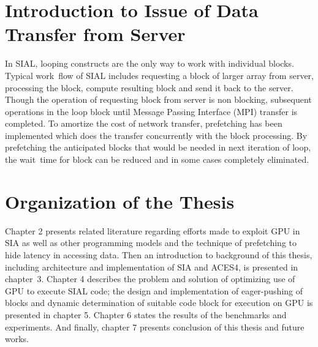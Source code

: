 \section{Introduction to Issue of Data Transfer from Server}
In SIAL, looping constructs are the only way to work with individual blocks.
Typical work~flow of SIAL includes requesting a block of larger array from server,
processing the block, compute resulting block and send it back to the server. Though
the operation of requesting block from server is non blocking, subsequent operations
in the loop block until Message Passing Interface (MPI) transfer is completed. To amortize the cost of network
transfer, prefetching has been implemented which does the transfer concurrently
with the block processing. By prefetching the anticipated blocks that would be
needed in next iteration of loop, the wait~time for block can be reduced and
in some cases completely eliminated.

\section{Organization of the Thesis}
Chapter 2 presents related literature regarding efforts made to exploit GPU in
SIA as well as other programming models and the technique of prefetching to hide
latency in accessing data. Then an introduction to background of this thesis,
including architecture and implementation of SIA and ACES4, is presented in chapter~3.
Chapter 4 describes the problem and solution of optimizing use of GPU to execute SIAL
code; the design and implementation of eager-pushing of blocks and dynamic
determination of suitable code block for execution on GPU is presented in
chapter 5. Chapter 6 states the results of the benchmarks and experiments. And
finally, chapter 7 presents conclusion of this thesis and future works.